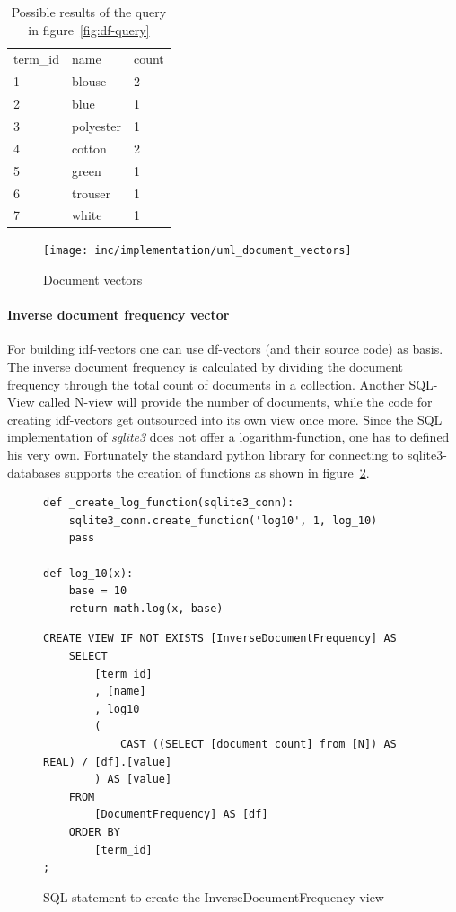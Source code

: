 \begin{table}
    \center
    \begin{tabular}{ l | l | l } 
        \rowcolor{LightSlateGrey}
        \multicolumn{3}{ c }{\textbf{df}}\\\hline
        term\_id    & name      & count\\\hline
        1           & blouse    & 2\\
        2           & blue      & 1\\
        3           & polyester & 1\\
        4           & cotton    & 2\\
        5           & green     & 1\\
        6           & trouser   & 1\\
        7           & white     & 1\\
    \end{tabular}
    \caption{Possible results of the query in figure~\ref{fig:df-query}}
    \label{tab:df-query-result}
\end{table}

\begin{figure}[h]
    \center
    \texttt{[image: inc/implementation/uml\_document\_vectors]}
    \caption{Document vectors}
    \label{fig:uml-document-vectors}
\end{figure}

\paragraph{Inverse document frequency vector}
For building idf-vectors one can use df-vectors (and their source code) as basis.
The inverse document frequency is calculated by dividing the document frequency through the total count of documents in a collection.
Another SQL-View called N-view will provide the number of documents, while the code for creating idf-vectors get outsourced into its own view once more.
Since the SQL implementation of \textit{sqlite3} does not offer a logarithm-function, one has to defined his very own.
Fortunately the standard python library for connecting to sqlite3-databases supports the creation of functions as shown in figure~\ref{fig:idf-view}.


\begin{figure}
    \lstset{language=Python}
    \begin{lstlisting}
def _create_log_function(sqlite3_conn):
    sqlite3_conn.create_function('log10', 1, log_10)
    pass

def log_10(x):
    base = 10
    return math.log(x, base)
    \end{lstlisting}
    \lstset{language=SQL}
    \begin{lstlisting}
CREATE VIEW IF NOT EXISTS [InverseDocumentFrequency] AS
    SELECT
        [term_id]
        , [name]
        , log10
        (
            CAST ((SELECT [document_count] from [N]) AS REAL) / [df].[value]
        ) AS [value]
    FROM
        [DocumentFrequency] AS [df]
    ORDER BY
        [term_id]
;
    \end{lstlisting}
    \caption{SQL-statement to create the InverseDocumentFrequency-view}
    \label{fig:idf-view}
\end{figure}


